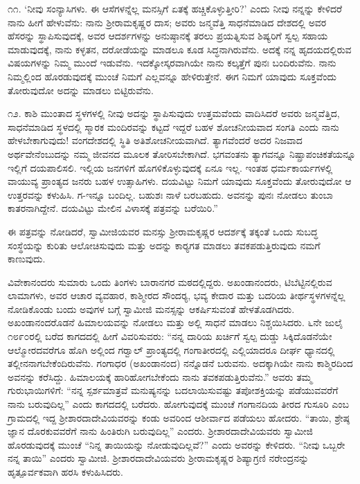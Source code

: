  ೧೧. ‘ನೀವು ಸಂನ್ಯಾಸಿಗಳು. ಈ ಆಸೆಗಳನ್ನೆಲ್ಲ ಮನಸ್ಸಿಗೆ ಏತಕ್ಕೆ ಹಚ್ಚಿಕೊಳ್ಳುತ್ತೀರಿ?’ ಎಂದು ನೀವು ನನ್ನನ್ನು ಕೇಳಿದರೆ ನಾನು ಹೀಗೆ ಹೇಳುವೆನು: ನಾನು ಶ‍್ರೀರಾಮಕೃಷ್ಣರ ದಾಸ; ಅವರು ಜನ್ಮವೆತ್ತಿ ಸಾಧನೆಮಾಡಿದ ದೇಶದಲ್ಲಿ ಅವರ ಹೆಸರನ್ನು ಸ್ಥಾಪಿಸುವುದಕ್ಕೆ, ಅವರ ಆದರ್ಶಗಳನ್ನು ಅನುಷ್ಠಾನಕ್ಕೆ ತರಲು ಪ್ರಯತ್ನಿಸುವ ಶಿಷ್ಯರಿಗೆ ಸ್ವಲ್ಪ ಸಹಾಯ ಮಾಡುವುದಕ್ಕೆ, ನಾನು ಕಳ್ಳತನ, ದರೋಡೆಯನ್ನು ಮಾಡಲೂ ಕೂಡ ಸಿದ್ಧನಾಗಿರುವೆನು. ಅದಕ್ಕೆ ನನ್ನ ಹೃದಯದಲ್ಲಿರುವ ವಿಷಯಗಳನ್ನು ನಿಮ್ಮ ಮುಂದೆ ಇಡುವೆನು. ಇದಕ್ಕೋಸ್ಕರವಾಗಿಯೇ ನಾನು ಕಲ್ಕತ್ತೆಗೆ ಪುನಃ ಬಂದಿರುವೆನು. ನಾನು ನಿಮ್ಮಲ್ಲಿಂದ ಹೊರಡುವುದಕ್ಕೆ ಮುಂಚೆ ನಿಮಗೆ ಎಲ್ಲವನ್ನೂ ಹೇಳಿರುತ್ತೇನೆ. ಈಗ ನಿಮಗೆ ಯಾವುದು ಸೂಕ್ತವೆಂದು ತೋರುವುದೋ ಅದನ್ನು ಮಾಡಲು ಬಿಟ್ಟಿರುವೆನು. 

 ೧೨. ಕಾಶಿ ಮುಂತಾದ ಸ್ಥಳಗಳಲ್ಲಿ ನೀವು ಅದನ್ನು ಸ್ಥಾಪಿಸುವುದು ಉತ್ತಮವೆಂದು ವಾದಿಸಿದರೆ ಅವರು ಜನ್ಮವೆತ್ತಿದ, ಸಾಧನೆಮಾಡಿದ ಸ್ಥಳದಲ್ಲಿ ಸ್ಮಾರಕ ಮಂದಿರವನ್ನು ಕಟ್ಟದೆ ಇದ್ದರೆ ಬಹಳ ಶೋಚನೀಯವಾದ ಸಂಗತಿ ಎಂದು ನಾನು ಹೇಳಬೇಕಾಗುವುದು! ವಂಗದೇಶದಲ್ಲಿ ಸ್ಥಿತಿ ಅತಿಶೋಚನೀಯವಾಗಿದೆ. ತ್ಯಾಗವೆಂದರೆ ಅದರ ನಿಜವಾದ ಅರ್ಥವೇನೆಂಬುದನ್ನು ನಮ್ಮ ಜೀವನದ ಮೂಲಕ ತೋರಿಸಬೇಕಾಗಿದೆ. ಭಗವಂತನು ತ್ಯಾಗವನ್ನೂ ನಿಷ್ಪ್ರಾಪಂಚಿಕತೆಯನ್ನೂ ಇಲ್ಲಿಗೆ ದಯಪಾಲಿಸಲಿ. ಇಲ್ಲಿಯ ಜನಗಳಿಗೆ ಹೊಗಳಿಕೊಳ್ಳುವುದಕ್ಕೆ ಏನೂ ಇಲ್ಲ. ಇಂತಹ ಧರ್ಮಕಾರ್ಯಗಳಲ್ಲಿ ವಾಯುವ್ಯ ಪ್ರಾಂತ್ಯದ ಜನರು ಬಹಳ ಉತ್ಸಾಹಿಗಳು. ದಯವಿಟ್ಟು ನಿಮಗೆ ಯಾವುದು ಸೂಕ್ತವೆಂದು ತೋರುವುದೋ ಆ ಉತ್ತರವನ್ನು ಕಳುಹಿಸಿ. ಗ-ಇನ್ನೂ ಬಂದಿಲ್ಲ. ಬಹುಶಃ ನಾಳೆ ಬರಬಹುದು. ಅವನನ್ನು ಪುನಃ ನೋಡಲು ತುಂಬಾ ಕಾತರನಾಗಿದ್ದೇನೆ. ದಯವಿಟ್ಟು ಮೇಲಿನ ವಿಳಾಸಕ್ಕೆ ಪತ್ರವನ್ನು ಬರೆಯಿರಿ.” 

 ಈ ಪತ್ರವನ್ನು ನೋಡಿದರೆ, ಸ್ವಾಮೀಜಿಯವರ ಮನಸ್ಸು ಶ‍್ರೀರಾಮಕೃಷ್ಣರ ಆದರ್ಶಕ್ಕೆ ತಕ್ಕಂತೆ ಒಂದು ಸುಬದ್ಧ ಸಂಸ್ಥೆಯನ್ನು ಕುರಿತು ಆಲೋಚಿಸುವುದು ಮತ್ತು ಅದನ್ನು ಕಾರ‍್ಯಗತ ಮಾಡಲು ತವಕಪಡುತ್ತಿರುವುದು ನಮಗೆ ಕಾಣುವುದು. 

 ವಿವೇಕಾನಂದರು ಸುಮಾರು ಒಂದು ತಿಂಗಳು ಬಾರಾನಗರ ಮಠದಲ್ಲಿದ್ದರು. ಅಖಂಡಾನಂದರು, ಟಿಬೆಟ್ಟಿನಲ್ಲಿರುವ ಲಾಮಾಗಳು, ಅವರ ಆಚಾರ ವ್ಯವಹಾರ, ಕಾಶ್ಮೀರದ ಸೌಂದರ‍್ಯ, ಭವ್ಯ ಕೇದಾರ ಮತ್ತು ಬದರಿಯ ತೀರ್ಥಸ್ಥಳಗಳನ್ನೆಲ್ಲ ನೋಡಿಕೊಂಡು ಬಂದು ಅವುಗಳ ಬಗ್ಗೆ ಸ್ವಾಮೀಜಿ ಮನಸ್ಸನ್ನು ಆಕರ್ಷಿಸುವಂತೆ ಹೇಳತೊಡಗಿದರು. ಅಖಂಡಾನಂದರೊಡನೆ ಹಿಮಾಲಯವನ್ನು ನೋಡಲು ಮತ್ತು ಅಲ್ಲಿ ಸಾಧನೆ ಮಾಡಲು ನಿಶ್ಚಯಿಸಿದರು. ೬ನೇ ಜುಲೈ ೧೮೯೦ರಲ್ಲಿ ಬರೆದ ಕಾಗದದಲ್ಲಿ ಹೀಗೆ ವಿವರಿಸುವರು: “ನನ್ನ ದಾರಿಯ ಖರ್ಚಿಗೆ ಸ್ವಲ್ಪ ದುಡ್ಡು ಸಿಕ್ಕಿದೊಡನೆಯೇ ಆಲ್ಮೋರದವರೆಗೂ ಹೊಗಿ ಅಲ್ಲಿಂದ ಗರ‍್ವಾಲ್ ಪ್ರಾಂತ್ಯದಲ್ಲಿ ಗಂಗಾತೀರದಲ್ಲಿ ಎಲ್ಲಿಯಾದರೂ ದೀರ್ಘ ಧ್ಯಾನದಲ್ಲಿ ತಲ್ಲೀನನಾಗಬೇಕೆಂದಿರುವೆನು. ಗಂಗಾಧರ (ಅಖಂಡಾನಂದ) ನನ್ನೊಡನೆ ಬರುವನು. ಅದಕ್ಕಾಗಿಯೇ ನಾನು ಕಾಶ್ಮಿರದಿಂದ ಅವನನ್ನು ಕರೆಸಿದ್ದು. ಹಿಮಾಲಯಕ್ಕೆ ಹಾರಿಹೋಗಬೇಕೆಂದು ನಾನು ತವಕಪಡುತ್ತಿರುವೆನು.” ಅವರು ತಮ್ಮ ಗುರುಭಾಯಿಗಳಿಗೆ: “ನನ್ನ ಸ್ಪರ್ಶಮಾತ್ರವೆ ಮನುಷ್ಯನನ್ನು ಬದಲಾಯಿಸುವಷ್ಟು ತಪೋಶಕ್ತಿಯನ್ನು ಪಡೆಯುವವರೆಗೆ ನಾನು ಬರುವುದಿಲ್ಲ” ಎಂದು ಕಾಗದದಲ್ಲಿ ಬರೆದರು. ಹೋಗುವುದಕ್ಕೆ ಮುಂಚೆ ಗಂಗಾನದಿಯ ತೀರದ ಗುಸೂರಿ ಎಂಬ ಗ್ರಾಮದಲ್ಲಿ ಇದ್ದ ಶ‍್ರೀಶಾರದಾದೇವಿಯವರನ್ನು ಕಂಡು ಅವರಿಂದ ಆಶೀರ್ವಾದ ಪಡೆಯಲು ಹೋದರು. “ತಾಯಿ, ಶ್ರೇಷ್ಠ ಜ್ಞಾನ ದೊರಕುವವರೆಗೆ ನಾನು ಹಿಂತಿರುಗಿ ಬರುವುದಿಲ್ಲ” ಎಂದರು. ಶ‍್ರೀಶಾರದಾದೇವಿಯವರು ಸ್ವಾಮೀಜಿ ಹೊರಡುವುದಕ್ಕೆ ಮುಂಚೆ “ನಿನ್ನ ತಾಯಿಯನ್ನು ನೋಡುವುದಿಲ್ಲವೆ?” ಎಂದು ಅವರನ್ನು ಕೇಳಿದರು. “ನೀವು ಒಬ್ಬರೇ ನನ್ನ ತಾಯಿ” ಎಂದರು ಸ್ವಾಮೀಜಿ. ಶ‍್ರೀಶಾರದಾದೇವಿಯವರು ಶ‍್ರೀರಾಮಕೃಷ್ಣರ ಶಿಷ್ಯಾಗ್ರಣಿ ನರೇಂದ್ರನನ್ನು ಹೃತ್ಪೂರ್ವಕವಾಗಿ ಹರಸಿ ಕಳುಹಿಸಿದರು.

